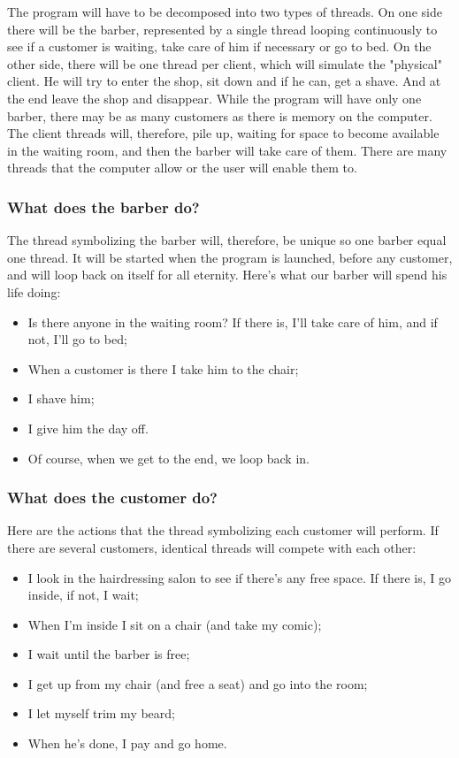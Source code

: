 \documentclass{article}
\begin{document}
The program will have to be decomposed into two types of threads. On one side there will be the barber, represented by a single thread looping continuously to see if a customer is waiting, take care of him if necessary or go to bed. On the other side, there will be one thread per client, which will simulate the "physical" client. He will try to enter the shop, sit down and if he can, get a shave. And at the end leave the shop and disappear.
While the program will have only one barber, there may be as many customers as there is memory on the computer. The client threads will, therefore, pile up, waiting for space to become available in the waiting room, and then the barber will take care of them. There are many threads that the computer allow or the user will enable them to.

\subsubsection{ What does the barber do?}
The thread symbolizing the barber will, therefore, be unique so one barber equal one thread. It will be started when the program is launched, before any customer, and will loop back on itself for all eternity.
Here's what our barber will spend his life doing:

\begin{itemize}
    \item Is there anyone in the waiting room? If there is, I'll take care of him, and if not, I'll go to bed;
    \item When a customer is there I take him to the chair;
    \item I shave him;
    \item I give him the day off.
    \item Of course, when we get to the end, we loop back in.
\end{itemize}

\subsubsection{ What does the customer do?}

Here are the actions that the thread symbolizing each customer will perform. If there are several customers, identical threads will compete with each other:

\begin{itemize}
    \item I look in the hairdressing salon to see if there's any free space. If there is, I go inside, if not, I wait;
    \item When I'm inside I sit on a chair (and take my comic);
    \item I wait until the barber is free;
    \item I get up from my chair (and free a seat) and go into the room;
    \item I let myself trim my beard;
    \item When he's done, I pay and go home.
\end{itemize}
\end{document}
